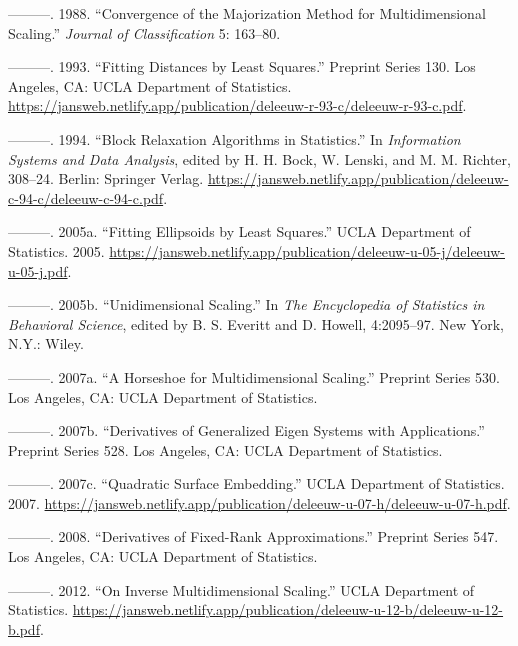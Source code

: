 \documentclass[
  12pt,
  letterpaper,
  DIV=11,
  numbers=noendperiod]{scrreprt}
\newlength{\cslhangindent}
\newenvironment{CSLReferences}[2] %
 {\begin{list}{}{%
  \setlength{\itemindent}{0pt}
  \setlength{\leftmargin}{0pt}
  \setlength{\parsep}{0pt}
  \ifodd #1
   \setlength{\leftmargin}{\cslhangindent}
   \setlength{\itemindent}{-1\cslhangindent}
  \fi
  \setlength{\itemsep}{#2\baselineskip}}}
 {\end{list}}
\theoremstyle{remark}
\begin{document}
\begin{CSLReferences}{1}{0}
---------. 1988. {``Convergence of the Majorization Method for
Multidimensional Scaling.''} \emph{Journal of Classification} 5:
163--80.

---------. 1993. {``Fitting Distances by Least Squares.''} Preprint
Series 130. Los Angeles, CA: UCLA Department of Statistics.
\url{https://jansweb.netlify.app/publication/deleeuw-r-93-c/deleeuw-r-93-c.pdf}.

---------. 1994. {``{Block Relaxation Algorithms in Statistics}.''} In
\emph{Information Systems and Data Analysis}, edited by H. H. Bock, W.
Lenski, and M. M. Richter, 308--24. Berlin: Springer Verlag.
\url{https://jansweb.netlify.app/publication/deleeuw-c-94-c/deleeuw-c-94-c.pdf}.

---------. 2005a. {``{Fitting Ellipsoids by Least Squares}.''} UCLA
Department of Statistics. 2005.
\url{https://jansweb.netlify.app/publication/deleeuw-u-05-j/deleeuw-u-05-j.pdf}.

---------. 2005b. {``{Unidimensional Scaling}.''} In \emph{The
Encyclopedia of Statistics in Behavioral Science}, edited by B. S.
Everitt and D. Howell, 4:2095--97. New York, N.Y.: Wiley.

---------. 2007a. {``{A Horseshoe for Multidimensional Scaling}.''}
Preprint Series 530. Los Angeles, CA: UCLA Department of Statistics.

---------. 2007b. {``Derivatives of Generalized Eigen Systems with
Applications.''} Preprint Series 528. Los Angeles, CA: UCLA Department
of Statistics.

---------. 2007c. {``{Quadratic Surface Embedding}.''} UCLA Department
of Statistics. 2007.
\url{https://jansweb.netlify.app/publication/deleeuw-u-07-h/deleeuw-u-07-h.pdf}.

---------. 2008. {``{Derivatives of Fixed-Rank Approximations}.''}
Preprint Series 547. Los Angeles, CA: UCLA Department of Statistics.

---------. 2012. {``{On Inverse Multidimensional Scaling}.''} UCLA
Department of Statistics.
\url{https://jansweb.netlify.app/publication/deleeuw-u-12-b/deleeuw-u-12-b.pdf}.


\end{CSLReferences}
\end{document}
